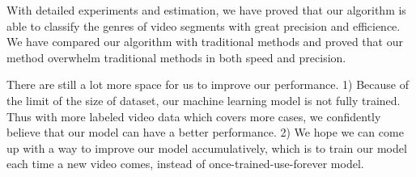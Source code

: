 \documentclass{article}
\begin{document}
With detailed experiments and estimation, we have proved that our algorithm is able to classify the genres of video segments with great precision and efficience. We have compared our algorithm with traditional methods and proved that our method overwhelm traditional methods in both speed and precision. 

There are still a lot more space for us to improve our performance. 1) Because of the limit of the size of dataset, our machine learning model is not fully trained. Thus with more labeled video data which covers more cases, we confidently believe that our model can have a better performance. 2) We hope we can come up with a way to improve our model accumulatively, which is to train our model each time a new video comes, instead of once-trained-use-forever model.



\end{document}
